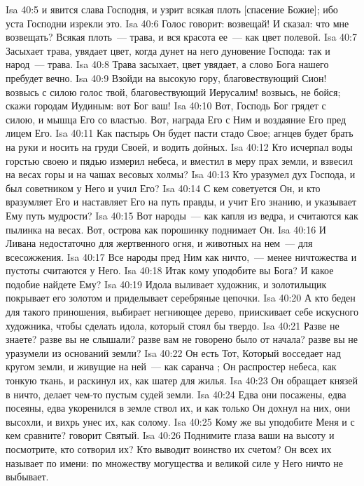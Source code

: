 \vs Isa 40:5 и явится слава Господня, и узрит всякая плоть [спасение Божие]; ибо уста Господни изрекли это.
\vs Isa 40:6 Голос говорит: возвещай! И сказал: что мне возвещать? Всякая плоть~--- трава, и вся красота ее~--- как цвет полевой.
\vs Isa 40:7 Засыхает трава, увядает цвет, когда дунет на него дуновение Господа: так и народ~--- трава.
\vs Isa 40:8 Трава засыхает, цвет увядает, а слово Бога нашего пребудет вечно.
\vs Isa 40:9 Взойди на высокую гору, благовествующий Сион! возвысь с силою голос твой, благовествующий Иерусалим! возвысь, не бойся; скажи городам Иудиным: вот Бог ваш!
\vs Isa 40:10 Вот, Господь Бог грядет с силою, и мышца Его со властью. Вот, награда Его с Ним и воздаяние Его пред лицем Его.
\vs Isa 40:11 Как пастырь Он будет пасти стадо Свое; агнцев будет брать на руки и носить на груди Своей, и водить дойных.
\vs Isa 40:12 Кто исчерпал воды горстью своею и пядью измерил небеса, и вместил в меру прах земли, и взвесил на весах горы и на чашах весовых холмы?
\vs Isa 40:13 Кто уразумел дух Господа, и был советником у Него и учил Его?
\vs Isa 40:14 С кем советуется Он, и кто вразумляет Его и наставляет Его на путь правды, и учит Его знанию, и указывает Ему путь мудрости?
\vs Isa 40:15 Вот народы~--- как капля из ведра, и считаются как пылинка на весах. Вот, острова как порошинку поднимает Он.
\vs Isa 40:16 И Ливана недостаточно для жертвенного огня, и животных на нем~--- для всесожжения.
\vs Isa 40:17 Все народы пред Ним как ничто,~--- менее ничтожества и пустоты считаются у Него.
\vs Isa 40:18 Итак кому уподобите вы Бога? И какое подобие найдете Ему?
\vs Isa 40:19 Идола выливает художник, и золотильщик покрывает его золотом и приделывает серебряные цепочки.
\vs Isa 40:20 А кто беден для такого приношения, выбирает негниющее дерево, приискивает себе искусного художника, чтобы сделать идола, который стоял бы твердо.
\vs Isa 40:21 Разве не знаете? разве вы не слышали? разве вам не говорено было от начала? разве вы не уразумели из оснований земли?
\vs Isa 40:22 Он есть Тот, Который восседает над кругом земли, и живущие на ней~--- как саранча ; Он распростер небеса, как тонкую ткань, и раскинул их, как шатер для жилья.
\vs Isa 40:23 Он обращает князей в ничто, делает чем-то пустым судей земли.
\vs Isa 40:24 Едва они посажены, едва посеяны, едва укоренился в земле ствол их, и как только Он дохнул на них, они высохли, и вихрь унес их, как солому.
\vs Isa 40:25 Кому же вы уподобите Меня и с кем сравните? говорит Святый.
\vs Isa 40:26 Поднимите глаза ваши на высоту  и посмотрите, кто сотворил их? Кто выводит воинство их счетом? Он всех их называет по имени: по множеству могущества и великой силе у Него ничто не выбывает.
